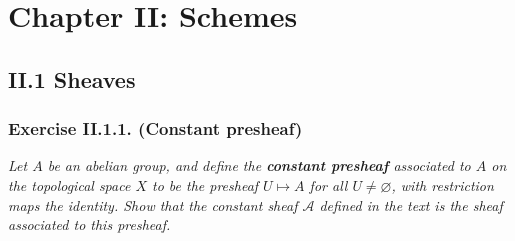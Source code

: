 \documentclass{article}
\begin{document}
\newpage
\section*{Chapter II: Schemes \\}



\subsection*{II.1 Sheaves \\}



\subsubsection*{Exercise II.1.1. (Constant presheaf)}
\emph{Let $A$ be an abelian group, and define the \textbf{constant presheaf}
associated to $A$ on the topological space $X$ to be
the presheaf $U \mapsto A$ for all $U \neq \varnothing$,
with restriction maps the identity.
Show that the constant sheaf $\mathscr{A}$ defined in the text is
the sheaf associated to this presheaf.} \\
\end{document}
